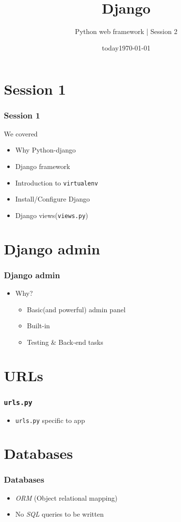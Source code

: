 \documentclass[bigger, presentation]{beamer}
\date{today}
\subtitle{Python web framework | Session 2}
\institute{Indian Institute of Technology Bombay}
\title{Django}
\author{}
\date{\today}
\begin{document}
\maketitle

\section{Session 1}
\label{sec-1}
\begin{frame}
\frametitle{Session 1}
\label{sec-1-1}

   We covered
   
\begin{itemize}
\item Why Python-django
\item Django framework
\item Introduction to \texttt{virtualenv}
\item Install/Configure Django
\item Django views(\texttt{views.py})
\end{itemize}
\end{frame}
\section{Django admin}
\label{sec-2}
\begin{frame}
\frametitle{Django admin}
\label{sec-2-1}

\begin{itemize}
\item Why?
\begin{itemize}
\item Basic(and powerful) admin panel
\item Built-in
\item Testing \& Back-end tasks
\end{itemize}
\end{itemize}
\end{frame}
\section{URLs}
\label{sec-3}
\begin{frame}
\frametitle{\texttt{urls.py}}
\label{sec-3-1}

\begin{itemize}
\item \texttt{urls.py} specific to app
\end{itemize}
     
\end{frame}
\section{Databases}
\label{sec-4}
\begin{frame}
\frametitle{Databases}
\label{sec-4-1}

\begin{itemize}
\item \emph{ORM} (Object relational mapping)
\item No \emph{SQL} queries to be written
\end{itemize}
\end{frame}
\end{document}
